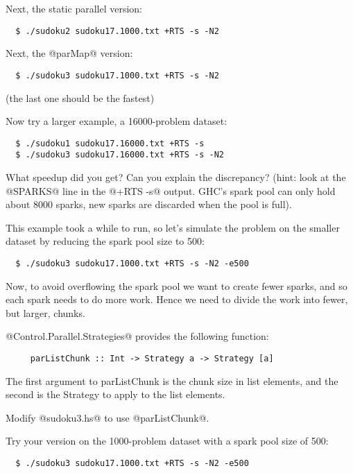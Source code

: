 \documentclass[11pt,a4paper]{article}
\begin{document}
\noindent Next, the static parallel version:

{\small \begin{verbatim}
  $ ./sudoku2 sudoku17.1000.txt +RTS -s -N2
\end{verbatim}}

\noindent Next, the @parMap@ version:

{\small \begin{verbatim}
  $ ./sudoku3 sudoku17.1000.txt +RTS -s -N2
\end{verbatim}}

\noindent (the last one should be the fastest)

Now try a larger example, a 16000-problem dataset:

{\small \begin{verbatim}
  $ ./sudoku1 sudoku17.16000.txt +RTS -s
  $ ./sudoku3 sudoku17.16000.txt +RTS -s -N2
\end{verbatim}}

What speedup did you get?  Can you explain the discrepancy? (hint:
look at the @SPARKS@ line in the @+RTS -s@ output.  GHC's spark pool
can only hold about 8000 sparks, new sparks are discarded when the
pool is full).

This example took a while to run, so let's simulate the problem on the
smaller dataset by reducing the spark pool size to 500:

{\small \begin{verbatim}
  $ ./sudoku3 sudoku17.1000.txt +RTS -s -N2 -e500
\end{verbatim}}

Now, to avoid overflowing the spark pool we want to create fewer
sparks, and so each spark needs to do more work.  Hence we need to
divide the work into fewer, but larger, chunks.

@Control.Parallel.Strategies@ provides the following function:

{\small \begin{verbatim}
     parListChunk :: Int -> Strategy a -> Strategy [a]
\end{verbatim}}

The first argument to parListChunk is the chunk size in list elements,
and the second is the Strategy to apply to the list elements.

Modify @sudoku3.hs@ to use @parListChunk@.

Try your version on the 1000-problem dataset with a spark pool size of 500:

{\small \begin{verbatim}
  $ ./sudoku3 sudoku17.1000.txt +RTS -s -N2 -e500
\end{verbatim}}
\end{document}
